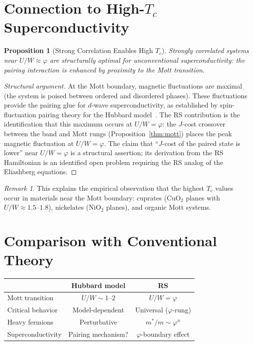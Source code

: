 \documentclass[12pt,a4paper]{article}
\newtheorem{proposition}[theorem]{Proposition}
\theoremstyle{definition}
\theoremstyle{remark}
\newtheorem{remark}[theorem]{Remark}
\begin{document}
\section{Connection to High-$T_c$ Superconductivity}
\label{sec:htsc}

\begin{proposition}[Strong Correlation Enables High $T_c$]
Strongly correlated systems near $U/W \approx \varphi$ are
structurally optimal for unconventional superconductivity: the
pairing interaction is enhanced by proximity to the Mott transition.
\end{proposition}

\begin{proof}[Structural argument]
At the Mott boundary, magnetic fluctuations are maximal
(the system is poised between ordered and disordered phases).
These fluctuations provide the pairing glue for $d$-wave
superconductivity, as established by spin-fluctuation pairing
theory for the Hubbard model~\cite{Imada1998}.  The RS contribution
is the identification that this maximum occurs at $U/W = \varphi$:
the $J$-cost crossover between the band and Mott rungs (Proposition~\ref{thm:mott})
places the peak magnetic fluctuation at $U/W = \varphi$.  The
claim that ``$J$-cost of the paired state is lower'' near $U/W = \varphi$
is a structural assertion; its derivation from the RS Hamiltonian
is an identified open problem requiring the RS analog of the
Eliashberg equations.
\end{proof}

\begin{remark}
This explains the empirical observation that the highest $T_c$
values occur in materials near the Mott boundary: cuprates
(CuO$_2$ planes with $U/W \approx 1.5$--$1.8$), nickelates
(NiO$_2$ planes), and organic Mott systems.
\end{remark}

\section{Comparison with Conventional Theory}
\label{sec:comparison}

\begin{center}
\renewcommand{\arraystretch}{1.3}
\begin{tabular}{@{}lcc@{}}
\toprule
& \textbf{Hubbard model} & \textbf{RS} \\
\midrule
Mott transition & $U/W \sim 1$--$2$ & $U/W = \varphi$ \\
Critical behavior & Model-dependent & Universal ($\varphi$-rung) \\
Heavy fermions & Perturbative & $m^*/m \sim \varphi^n$ \\
Superconductivity & Pairing mechanism? & $\varphi$-boundary effect \\
\bottomrule
\end{tabular}
\end{center}
\end{document}

